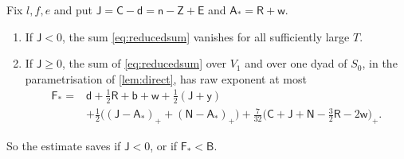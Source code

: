 \documentclass[11pt,colorlinks]{charlie}
\begin{document}
\begin{lemma}\label{lem:actuallevel}
Fix $l,f,e$ and put $\mathsf J=\mathsf C-\mathsf d=\mathsf n-\mathsf Z+\mathsf E$ and $\mathsf A_*=\mathsf R+\mathsf w$.
\begin{enumerate}[label=\textup{(\roman*)}]
\item If $\mathsf J<0$, the sum \eqref{eq:reducedsum} vanishes for all sufficiently large $T$.
\item If $\mathsf J\ge0$, the sum of \eqref{eq:reducedsum} over $V_1$ and over one dyad of $S_0$, in the parametrisation of \cref{lem:direct}, has raw exponent at most
\begin{equation}\label{eq:Fstar}
 \begin{split}
 \mathsf F_*={}&\mathsf d+\tfrac12\mathsf R+\mathsf b+\mathsf w+\tfrac12(\mathsf J+\mathsf y)\\
 &+\tfrac12\big((\mathsf J-\mathsf A_*)_++(\mathsf N-\mathsf A_*)_+\big)
 +\tfrac7{32}\big(\mathsf C+\mathsf J+\mathsf N-\tfrac32\mathsf R-2\mathsf w\big)_+ .
 \end{split}
\end{equation}
\end{enumerate}
So the estimate saves if $\mathsf J<0$, or if $\mathsf F_*<\mathsf B$.
\end{lemma}
\end{document}
